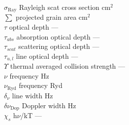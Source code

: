 \begin{tabbing}
$\sigma_{\mathrm{Ray}}$ \>  Rayleigh scat cross section \>  cm$^2$\\
$\sum$ \>  projected grain area \>  cm$^2$\\
$\tau$ \>  optical depth \> ---\\
$\tau_{abs}$ \>
absorption optical depth \> ---\\
$\tau_{scat}$ \>  scattering optical depth \> ---\\
$\tau_{u,l}$ \>  line
optical depth \> ---\\
$\Upsilon$ \>  thermal averaged collision strength\> --- \\
$\nu$ \>  frequency \>  Hz\\
$\nu_{\mathrm{Ryd}}$ \>
frequency \>  Ryd\\
$\delta_\nu$ \>  line width \> Hz\\
$\delta\nu_{\mathrm{Dop}}$ \>  Doppler width \>  Hz\\
$\chi_s$ \>  h$\nu$/kT \> ---\\
\end{tabbing}

